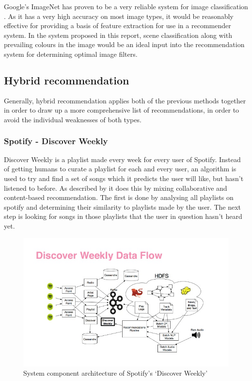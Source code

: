 \documentclass[a4paper,12pt]{report}
\begin{document}
        Google's ImageNet has proven to be a very reliable system for image classification \citep{krizhevsky2012imagenet}.
        As it has a very high accuracy on most image types, it would be reasonably effective for providing a basis of feature extraction for use in a recommender system. In the system proposed in this report, scene classification along with prevailing colours in the image would be an ideal input into the recommendation system for determining optimal image filters.


    \subsection{Hybrid recommendation}
      Generally, hybrid recommendation applies both of the previous methods together in order to draw up a more comprehensive list of recommendations, in order to avoid the individual weaknesses of both types.

      \subsubsection{Spotify - Discover Weekly}
      \label{discoverweekly}
        Discover Weekly is a playlist made every week for every user of Spotify. Instead of getting humans to curate a playlist for each and every user, an algorithm is used to try and find a set of songs which it predicts the user will like, but hasn't listened to before. As described by \cite{popper2015dw} it does this by mixing collaborative and content-based recommendation. The first is done by analysing all playlists on spotify and determining their similarity to playlists made by the user. The next step is looking for songs in those playlists that the user in question hasn't heard yet.

        \begin{figure}[ht]
          \centering
          \includegraphics[width=\linewidth]{discoverweekly-dataflow}
          \caption[System component architecture of Spotify's ‘Discover Weekly’]{System component architecture of Spotify's ‘Discover Weekly’ \protect\citep{johnson2015dw}}
          \label{fig:discoverweekly-dataflow}
        \end{figure}
\end{document}
